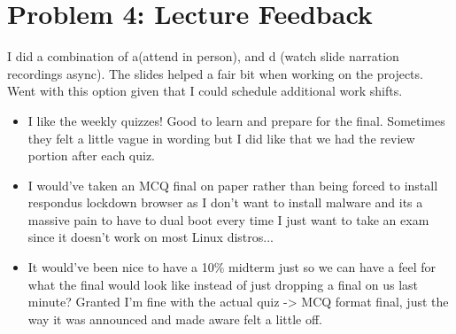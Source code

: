 \documentclass[11pt]{article}
\begin{document}
\section{Problem 4: Lecture Feedback}
I did a combination of a(attend in person), and d (watch slide narration recordings async). The slides helped a fair bit when working on the projects. Went with this option given that I could schedule additional work shifts.

\begin{itemize}
    \item I like the weekly quizzes! Good to learn and prepare for the final. Sometimes they felt a little vague in wording but I did like that we had the review portion after each quiz. 
    \item I would've taken an MCQ final on paper rather than being forced to install respondus lockdown browser as I don't want to install malware and its a massive pain to have to dual boot every time I just want to take an exam since it doesn't work on most Linux distros...
    \item It would've been nice to have a 10\% midterm just so we can have a feel for what the final would look like instead of just dropping a final on us last minute? Granted I'm fine with the actual quiz -> MCQ format final, just the way it was announced and made aware felt a little off.
    
\end{itemize}
\end{document}
